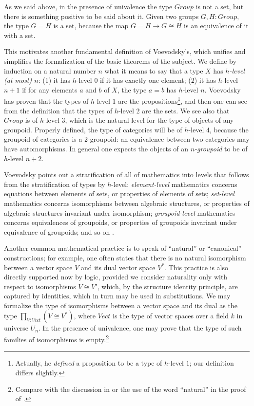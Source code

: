 \documentclass[letter,12pt]{amsart}
\theoremstyle{definition}
\theoremstyle{remark}
\numberwithin{equation}{section}
\newcommand{\isom}{\cong}
\begin{document}
As we said above, in the presence of univalence the type $Group$ is not a set, but there is something positive to be said about it.  Given two
groups $G, H : Group$, the type $G = H$ is a set, because the map $G = H \to G \isom H$ is an equivalence of it with a set.
\par
This motivates another fundamental definition of Voevodsky's, which unifies and simplifies the formalization of the basic theorems of the
subject.  We define by induction on a natural number $n$ what it means to say that a type $X$ has {\em $h$-level (at most) $n$}: (1) it has
$h$-level $0$ if it has exactly one element; (2) it has $h$-level $n+1$ if for any elements $a$ and $b$ of $X$, the type $a=b$ has $h$-level
$n$.  Voevodsky has proven that the types of $h$-level 1 are the propositions\footnote{Actually, he {\em defined} a proposition to be a type of
  $h$-level $1$; our definition differs slightly.}, and then one can see from the
definition that the types of 
$h$-level 2 are the sets.  We see also that $Group$ is of $h$-level $3$, which is the natural level for the type of objects of any groupoid.
Properly defined, the type of categories will be of $h$-level 4, because the groupoid of categories is a 2-groupoid: an equivalence between two
categories may have automorphisms.  In general one expects the objects of an {\em $n$-groupoid} to be of $h$-level $n+2$.

Voevodsky points out a stratification of all of mathematics into levels that follows from the stratification of types by $h$-level: {\em
  element-level} mathematics concerns equations between elements of sets, or properties of elements of sets; {\em set-level} mathematics
concerns isomorphisms between algebraic structures, or properties of algebraic structures invariant under isomorphism; {\em groupoid-level}
mathematics concerns equivalences of groupoids, or properties of groupoids invariant under equivalence of groupoids; and so on
\citep{UniMath2015}.

Another common mathematical practice is to speak of ``natural'' or ``canonical'' constructions; for example, one often states that there is no
natural isomorphism between a vector space $V$ and its dual vector space $V^*$.  This practice is also directly supported now by logic, provided
we consider naturality only with respect to isomorphisms $V \isom V'$, which, by the structure identity principle, are captured by identities,
which in turn may be used in substitutions.  We may formalize the type of isomorphisms between a vector space and its dual as the type
$\prod_{V:Vect} ( V \isom V^* )$, where $Vect$ is the type of vector spaces over a field $k$ in universe $U_n$.  In the presence of
univalence, one may prove that the type of such families of isomorphisms is empty.\footnote{Compare with the discussion in \citep{mcall} or the
  use of the word ``natural'' in the proof of \citep[Theorem 3.2.2]{hottbook}.}
\end{document}
